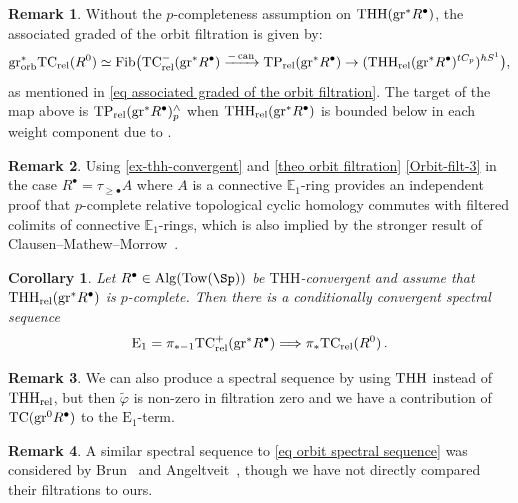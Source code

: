 \documentclass[english,10pt]{amsart}
\newcommand{\RomanNumeralCaps}[1]
    {\MakeUppercase{\romannumeral #1}}
\newcommand{\rel}{\textup{rel}}
\newtheorem{cor}{Corollary}[section]
\theoremstyle{definition}
\newtheorem{rema}{Remark}[section]
\numberwithin{equation}{section}
\DeclareMathOperator{\TC}{TC}
\DeclareMathOperator{\thh}{\ensuremath{\textup{THH}}}
\newcommand{\rntc}{\mathrm{TC}_{\rel}^{-}}
\newcommand{\rtp}{\mathrm{TP}_{\rel}}
\newcommand{\rtc}{\mathrm{TC}_{\rel}}
\newcommand{\rthh}{\mathrm{THH}_{\rel}}
\newcommand{\grorbast}{\mathrm{gr}_{\textup{orb}}^*}
\DeclareMathOperator{\can}{\ensuremath{\textup{can}}}
\newcommand{\Tow}{\mathrm{Tow}}
\newcommand{\Alg}{\mathrm{Alg}}
\newcommand{\gr}{\textup{gr}^*}
\begin{document}
\begin{rema}
Without the $p$-completeness assumption on $\thh(\gr R^{\bullet})$, the associated graded of the orbit filtration  is given by: 
\begin{equation}
\grorbast \rtc(R^0) \simeq \textup{Fib}\big(
\rntc(\gr R^{\bullet}) \xrightarrow{-\can}  \rtp(\gr R^\bullet)\to (\rthh(\gr R^{\bullet})^{tC_p})^{hS^1}\big),
\end{equation}
as mentioned in \eqref{eq associated graded of the orbit filtration}. The target of the map above is $\rtp(\gr R^{\bullet})_p^\wedge$ when $\rthh(\gr R^{\bullet})$ is bounded below in each weight component due to \cite[Lemma \RomanNumeralCaps{2}.4.2]{nikolausscholze2018topologicalcyclic}.
\end{rema}

\begin{rema} 
Using \autoref{ex-thh-convergent} and \autoref{theo orbit filtration} \eqref{Orbit-filt-3} in the case $R^{\bullet}=\tau_{\ge \bullet}A$ where $A$ is a connective $\mathbb{E}_1$-ring provides an independent proof that $p$-complete relative topological cyclic homology commutes with filtered colimits of connective $\mathbb{E}_1$-rings, which is also implied by the stronger result of Clausen--Mathew--Morrow~\cite[Corollary~2.15]{CMM21}. 
\end{rema}

\begin{cor}\label{coro orbit spectral sequence}
Let $R^{\bullet}\in \Alg(\Tow(\Sp))$ be $\mathrm{THH}$-convergent and assume that $\rthh(\gr R^{\bullet})$ is $p$-complete. Then there is a conditionally convergent spectral sequence 
\begin{equation}\label{eq orbit spectral sequence}
\mathrm{E}_1=\pi_{*-1}\mathrm{TC}_{\textup{rel}}^{+}(\gr R^{\bullet})\Longrightarrow \pi_*\rtc(R^0) \,.
\end{equation}
\end{cor}

\begin{rema}
We can also produce a spectral sequence by using $\thh$ instead of $\rthh$, but then $\widetilde{\varphi}$ is non-zero in filtration zero and we have a contribution of $\TC(\textup{gr}^0R^\bullet)$ to the $\mathrm{E}_1$-term. 
\end{rema}

\begin{rema}
A similar spectral sequence to \eqref{eq orbit spectral sequence} was considered by Brun~\cite{Bru01} and Angeltveit~\cite{Angeltveit2015kTheoryfinitewitt}, though we have not directly compared their filtrations to ours.
\end{rema}
\end{document}

